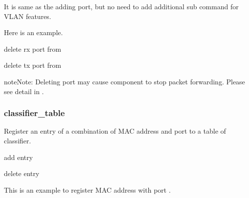 \documentclass[a4paper,11pt,openany,oneside,english]{sphinxmanual}
\begin{document}
\begin{sphinxVerbatim}[commandchars=\\\{\},formatcom=\footnotesize]
\end{sphinxVerbatim}

It is same as the adding port, but no need to add additional sub command
for VLAN features.

Here is an example.

\begin{sphinxVerbatim}[commandchars=\\\{\},formatcom=\footnotesize]
 delete rx port  from 

 delete tx port  from 
\end{sphinxVerbatim}

\begin{sphinxadmonition}{note}{Note:}
Deleting port may cause component to stop packet forwarding.
Please see detail in {\hyperref[\detokenize{design/spp_secondary:spp-design-spp-sec-vf}]{}}.
\end{sphinxadmonition}


\subsubsection{classifier\_table}
\label{\detokenize{commands/secondary/spp_vf:classifier-table}}\label{\detokenize{commands/secondary/spp_vf:commands-spp-vf-classifier-table}}
Register an entry of a combination of MAC address and port to
a table of classifier.

\begin{sphinxVerbatim}[commandchars=\\\{\},formatcom=\footnotesize]
 add entry

 delete entry
\end{sphinxVerbatim}

This is an example to register MAC address 
with port .
\end{document}
